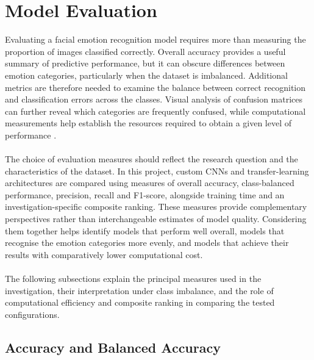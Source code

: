 \documentclass[12pt, a4paper]{report}
\let\oldsection\section
\renewcommand{\section}{%
    \Needspace{6\baselineskip}%
    \oldsection
}
\let\oldsubsection\subsection
\renewcommand{\subsection}{%
    \Needspace{6\baselineskip}%
    \oldsubsection
}
\begin{document}
		\section{Model Evaluation}
			
			Evaluating a facial emotion recognition model requires more than measuring the proportion of images classified correctly. Overall accuracy provides a useful summary of predictive performance, but it can obscure differences between emotion categories, particularly when the dataset is imbalanced. Additional metrics are therefore needed to examine the balance between correct recognition and classification errors across the classes. Visual analysis of confusion matrices can further reveal which categories are frequently confused, while computational measurements help establish the resources required to obtain a given level of performance \cite{Opitz2024ClassificationMetrics, Farhadpour2024MetricsImbalance}.\\\\
			The choice of evaluation measures should reflect the research question and the characteristics of the dataset. In this project, custom CNNs and transfer-learning architectures are compared using measures of overall accuracy, class-balanced performance, precision, recall and F1-score, alongside training time and an investigation-specific composite ranking. These measures provide complementary perspectives rather than interchangeable estimates of model quality. Considering them together helps identify models that perform well overall, models that recognise the emotion categories more evenly, and models that achieve their results with comparatively lower computational cost.\\\\
			The following subsections explain the principal measures used in the investigation, their interpretation under class imbalance, and the role of computational efficiency and composite ranking in comparing the tested configurations.
			
			\subsection{Accuracy and Balanced Accuracy}
				
\end{document}
